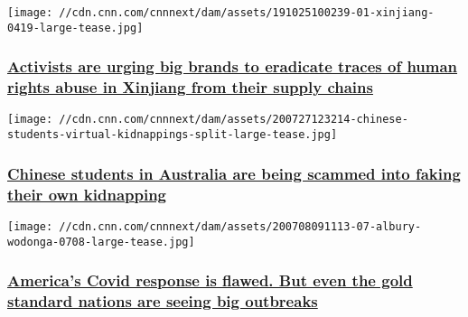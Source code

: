 \href{/2020/07/28/business/uyghurs-xinjiang-forced-labor-brands-intl-hnk/index.html}{}

\texttt{[image: //cdn.cnn.com/cnnnext/dam/assets/191025100239-01-xinjiang-0419-large-tease.jpg]}

\hypertarget{activists-are-urging-big-brands-to-eradicate-traces-of-human-rights-abuse-in-xinjiang-from-their-supply-chains}{%
\subsubsection{\texorpdfstring{\href{/2020/07/28/business/uyghurs-xinjiang-forced-labor-brands-intl-hnk/index.html}{Activists
are urging big brands to eradicate traces of human rights abuse in
Xinjiang from their supply
chains}}{Activists are urging big brands to eradicate traces of human rights abuse in Xinjiang from their supply chains}}\label{activists-are-urging-big-brands-to-eradicate-traces-of-human-rights-abuse-in-xinjiang-from-their-supply-chains}}

\href{/2020/07/28/australia/australia-virtual-kidnapping-scam-intl-hnk-scli/index.html}{}

\texttt{[image: //cdn.cnn.com/cnnnext/dam/assets/200727123214-chinese-students-virtual-kidnappings-split-large-tease.jpg]}

\hypertarget{chinese-students-in-australia-are-being-scammed-into-faking-their-own-kidnapping-}{%
\subsubsection{\texorpdfstring{\href{/2020/07/28/australia/australia-virtual-kidnapping-scam-intl-hnk-scli/index.html}{Chinese
students in Australia are being scammed into faking their own kidnapping
}}{Chinese students in Australia are being scammed into faking their own kidnapping }}\label{chinese-students-in-australia-are-being-scammed-into-faking-their-own-kidnapping-}}

\href{/2020/07/24/world/coronavirus-response-resurgence-wave-intl/index.html}{}

\texttt{[image: //cdn.cnn.com/cnnnext/dam/assets/200708091113-07-albury-wodonga-0708-large-tease.jpg]}

\hypertarget{americas-covid-response-is-flawed-but-even-the-gold-standard-nations-are-seeing-big-outbreaks}{%
\subsubsection{\texorpdfstring{\href{/2020/07/24/world/coronavirus-response-resurgence-wave-intl/index.html}{America's
Covid response is flawed. But even the gold standard nations are seeing
big
outbreaks}}{America's Covid response is flawed. But even the gold standard nations are seeing big outbreaks}}\label{americas-covid-response-is-flawed-but-even-the-gold-standard-nations-are-seeing-big-outbreaks}}

